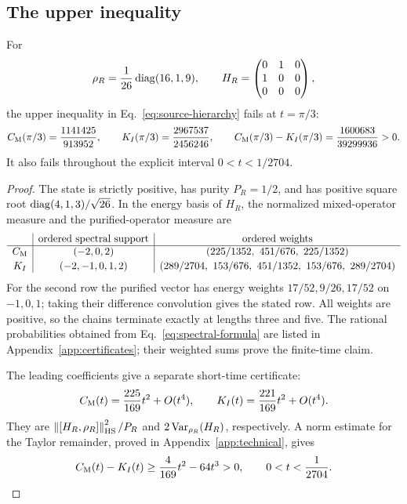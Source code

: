 \subsection{The upper inequality}
\begin{proposition}\label{prop:right}
For
\begin{equation}\label{eq:right-state}
 \rho_R=\frac1{26}\operatorname{diag}(16,1,9),\qquad
 H_R=\begin{pmatrix}0&1&0\\1&0&0\\0&0&0\end{pmatrix},
\end{equation}
the upper inequality in Eq.~\eqref{eq:source-hierarchy} fails at $t=\pi/3$:
\begin{equation}\label{eq:right-values}
 C_{\mathrm M}(\pi/3)=\frac{1141425}{913952},\qquad
 K_I(\pi/3)=\frac{2967537}{2456246},\qquad
 C_{\mathrm M}(\pi/3)-K_I(\pi/3)=\frac{1600683}{39299936}>0.
\end{equation}
It also fails throughout the explicit interval $0<t<1/2704$.
\end{proposition}
\begin{proof}
The state is strictly positive, has purity $P_R=1/2$, and has positive
square root $\operatorname{diag}(4,1,3)/\sqrt{26}$. In the energy basis of $H_R$, the
normalized mixed-operator measure and the purified-operator measure are
\begin{equation}\label{eq:right-measures}
 \begin{array}{c|c|c}
 &\text{ordered spectral support}&\text{ordered weights}\\ \hline
 \CM&(-2,0,2)&(225/1352,\ 451/676,\ 225/1352)\\[2pt]
 \KI&(-2,-1,0,1,2)&(289/2704,\ 153/676,\ 451/1352,\ 153/676,\ 289/2704)
 \end{array}
\end{equation}
For the second row the purified vector has energy weights $17/52,9/26,17/52$
on $-1,0,1$; taking their difference convolution gives the stated row.
All weights are positive, so the chains terminate exactly at lengths three
and five. The rational probabilities obtained from
Eq.~\eqref{eq:spectral-formula} are listed in
Appendix~\ref{app:certificates}; their weighted sums prove the finite-time
claim.

The leading coefficients give a separate short-time certificate:
\begin{equation}\label{eq:right-curvatures}
 C_{\mathrm M}(t)=\frac{225}{169}t^2+O(t^4),\qquad
 K_I(t)=\frac{221}{169}t^2+O(t^4).
\end{equation}
They are $\left\lVert [H_R,\rho_R]\right\rVert_{\mathrm{HS}}^2/P_R$ and
$2\operatorname{Var}_{\rho_R}(H_R)$, respectively. A norm estimate for the Taylor
remainder, proved in Appendix~\ref{app:technical}, gives
\begin{equation}\label{eq:right-interval}
 C_{\mathrm M}(t)-K_I(t)\ge\frac4{169}t^2-64t^3>0,
 \qquad 0<t<\frac1{2704}.
\end{equation}
\end{proof}

